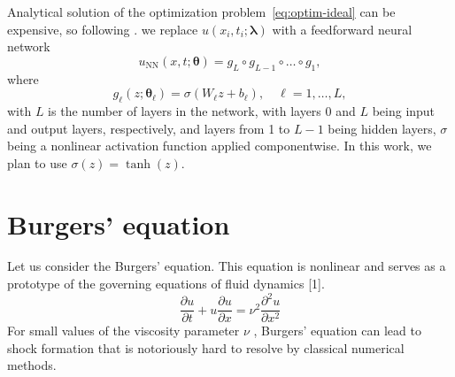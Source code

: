 \documentclass{beamer}
\renewcommand{\vec}[1]{\boldsymbol{#1}}
\newcommand{\VTheta}{\ensuremath{\vec{\theta}}}
\newcommand{\VLambda}{\ensuremath{\vec{\lambda}}}
\newcommand{\UNN}[1][\text{NN}]{u_{#1}}
\begin{document}
\begin{frame}

Analytical solution of the optimization problem~\eqref{eq:optim-ideal} can be expensive, so following \cite{raissi2017pinnII}.
we replace  $u(x_i, t_i; \VLambda)$ with a 
feedforward neural network \cite{goodfellow2016deep}
\begin{equation}
\UNN(x, t; \vec{\theta}) = g_L \circ g_{L-1} \circ \dots \circ g_1,
\end{equation}
where
\[
    g_\ell(z; \VTheta_\ell) = \sigma (W_\ell z + b_\ell), \quad \ell = 1,\dots,L,
\]
with $L$ is the number of layers in the network, with layers 0 and $L$ being
input and output layers, respectively, and layers from 1 to $L-1$ being hidden
layers, $\sigma$ being a nonlinear activation function applied
componentwise. In this work, we plan to use \( \sigma(z) = \tanh (z) \).
    
\end{frame}

\begin{frame}
    
\end{frame}






\section{Burgers' equation}

\begin{frame}

Let us consider the Burgers' equation. This equation is nonlinear and serves as a prototype of the governing equations of fluid dynamics [1]. 
\begin{equation}
    \frac{\partial u}{\partial t} + u \frac{\partial u}{\partial x} = \nu^2 \frac{\partial^2 u}{\partial x^2}
\end{equation}
For small values of the viscosity parameter $\nu$ , Burgers' equation can lead to shock formation that is notoriously hard to resolve by classical numerical methods. 

\end{frame}
\end{document}
